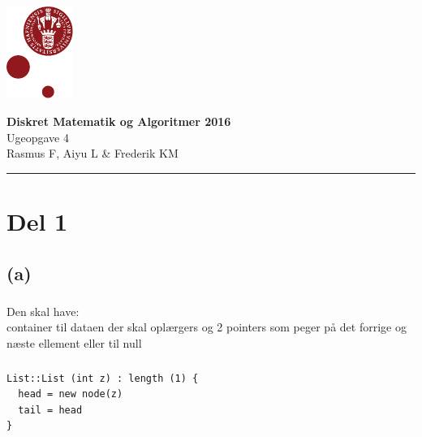 \documentclass[12pt, a4paper, hidelinks]{article}
\begin{document}
\begin{minipage}[b]{1.0\linewidth}
\includegraphics[height=30mm]{KULogo}

\vspace*{-16ex}
\begin{center}
    {\Large \bf Diskret Matematik og Algoritmer 2016} \vspace*{1ex} \\
    {\large Ugeopgave 4} \vspace*{1ex} \\
    {\large Rasmus F, Aiyu L \& Frederik KM}
\end{center}
\vspace*{-3pt}
{\color{KU-red}\hrule}
\end{minipage}
\vspace{2ex}

\tableofcontents \newpage

\setcounter{section}{0}
\setcounter{subsection}{-1}

\section{Del 1}

\subsection{(a)} 
\subsubsection{}
Den skal have: \\
container til dataen der skal oplærgers og 2 pointers som peger på det forrige og næste ellement eller til null \\

\subsubsection{}
\begin{lstlisting}
List::List (int z) : length (1) {
  head = new node(z)
  tail = head
}

\end{lstlisting}
\end{document}
